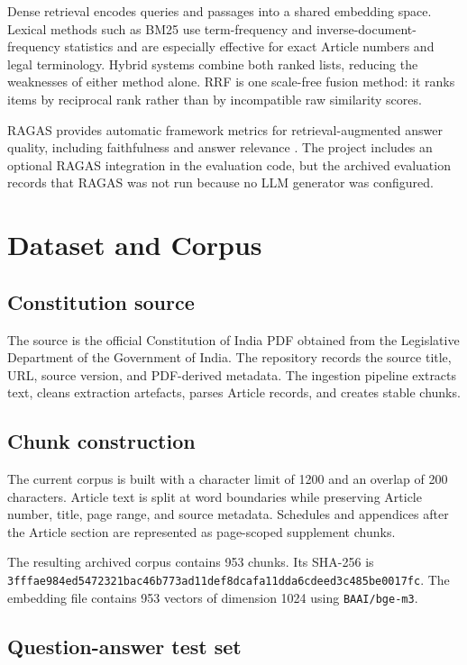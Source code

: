 \documentclass[11pt]{article}
\begin{document}
Dense retrieval encodes queries and passages into a shared embedding space. Lexical methods such as BM25 use term-frequency and inverse-document-frequency statistics and are especially effective for exact Article numbers and legal terminology. Hybrid systems combine both ranked lists, reducing the weaknesses of either method alone. RRF is one scale-free fusion method: it ranks items by reciprocal rank rather than by incompatible raw similarity scores.

RAGAS provides automatic framework metrics for retrieval-augmented answer quality, including faithfulness and answer relevance \cite{Ragas2024}. The project includes an optional RAGAS integration in the evaluation code, but the archived evaluation records that RAGAS was not run because no LLM generator was configured.

\section{Dataset and Corpus}

\subsection{Constitution source}

The source is the official Constitution of India PDF obtained from the Legislative Department of the Government of India. The repository records the source title, URL, source version, and PDF-derived metadata. The ingestion pipeline extracts text, cleans extraction artefacts, parses Article records, and creates stable chunks.

\subsection{Chunk construction}

The current corpus is built with a character limit of 1200 and an overlap of 200 characters. Article text is split at word boundaries while preserving Article number, title, page range, and source metadata. Schedules and appendices after the Article section are represented as page-scoped supplement chunks.

The resulting archived corpus contains 953 chunks. Its SHA-256 is
\texttt{3fffae984ed5472321bac46b773ad11def8dcafa11dda6cdeed3c485be0017fc}.
The embedding file contains 953 vectors of dimension 1024 using
\texttt{BAAI/bge-m3}.

\subsection{Question-answer test set}
\end{document}
